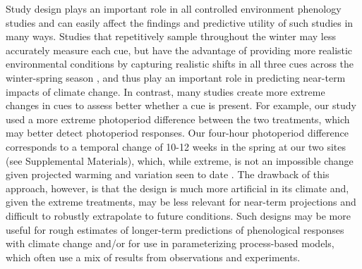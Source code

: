 \documentclass[11pt]{article}
\begin{document}
Study design plays an important role in all controlled environment phenology studies and can easily affect the findings and predictive utility of such studies in many ways. Studies that repetitively sample throughout the winter may less accurately measure each cue, but have the advantage of providing more realistic environmental conditions by capturing realistic shifts in all three cues across the winter-spring season \citep{Basler:2012aa}, and thus play an important role in predicting near-term impacts of climate change. In contrast, many studies \citep[e.g.,][]{Caffarra:2011aa,laube2014gcb} create more extreme changes in cues to assess better whether a cue is present. For example, our study used a more extreme photoperiod difference between the two treatments, which may better detect photoperiod responses. Our four-hour photoperiod difference corresponds to a temporal change of 10-12 weeks in the spring at our two sites (see Supplemental Materials), which, while extreme, is not an impossible change given projected warming and variation seen to date \citep{ipcc2013,Wolkovich:2012aa}. The drawback of this approach, however, is that the design is much more artificial in its climate and, given the extreme treatments, may be less relevant for near-term projections and difficult to robustly extrapolate to future conditions. Such designs may be more useful for rough estimates of longer-term predictions of phenological responses with climate change and/or for use in parameterizing process-based models, which often use a mix of results from observations and experiments. %
\end{document}
